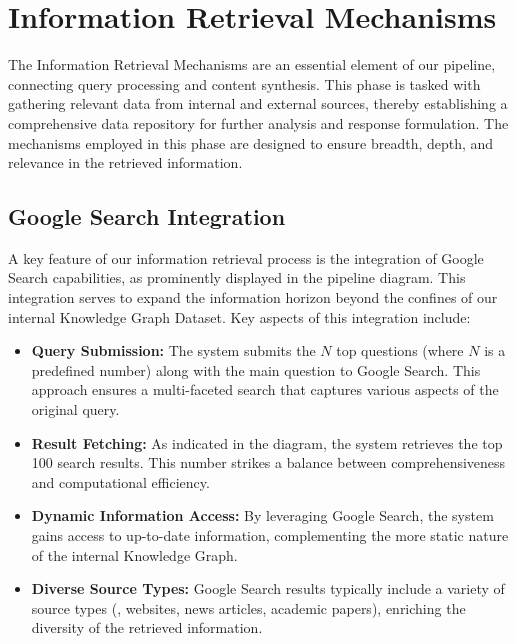 \section{Information Retrieval Mechanisms}\label{sec:information-retrieval-mechanisms}
The Information Retrieval Mechanisms are an essential element of our pipeline, connecting query processing and content synthesis.
This phase is tasked with gathering relevant data from internal and external sources, thereby establishing a comprehensive data repository for further analysis and response formulation.
The mechanisms employed in this phase are designed to ensure breadth, depth, and relevance in the retrieved information.

\subsection{Google Search Integration}\label{subsec:google-search-integration}
A key feature of our information retrieval process is the integration of Google Search capabilities, as prominently displayed in the pipeline diagram.
This integration serves to expand the information horizon beyond the confines of our internal Knowledge Graph Dataset.
Key aspects of this integration include:

\begin{itemize}
    \item \textbf{Query Submission:} The system submits the $N$ top questions (where $N$ is a predefined number) along with the main question to Google Search. This approach ensures a multi-faceted search that captures various aspects of the original query.
    \item \textbf{Result Fetching:} As indicated in the diagram, the system retrieves the top 100 search results. This number strikes a balance between comprehensiveness and computational efficiency.
    \item \textbf{Dynamic Information Access:} By leveraging Google Search, the system gains access to up-to-date information, complementing the more static nature of the internal Knowledge Graph.
    \item \textbf{Diverse Source Types:} Google Search results typically include a variety of source types (\eg, websites, news articles, academic papers), enriching the diversity of the retrieved information.
\end{itemize}

